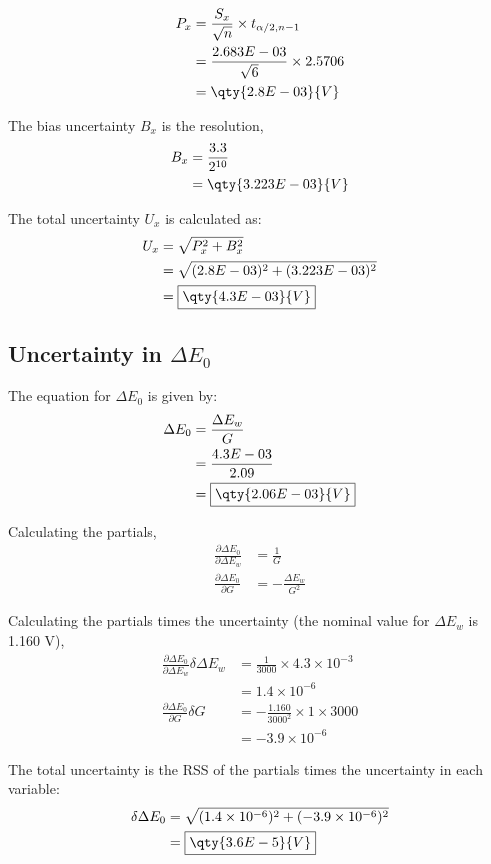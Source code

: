 \begin{align*}
    P_x &= \frac{S_x}{\sqrt{n}} \times t_{\alpha/2, n-1} \\
    &= \frac{2.683E-03}{\sqrt{6}} \times 2.5706 \\
    &= \qty{2.8E-03}{V}
\end{align*}

The bias uncertainty $B_x$ is the resolution, 
\begin{align*}
    B_x &= \frac{3.3}{2^{10}} \\
    &= \qty{3.223E-03}{V}
\end{align*}

The total uncertainty $U_x$ is calculated as:
\begin{align*}
    U_x &= \sqrt{P_x^2 + B_x^2} \\
    &= \sqrt{(2.8E-03)^2 + (3.223E-03)^2} \\
    &= \boxed{\qty{4.3E-03}{V}}
\end{align*}

\subsection{Uncertainty in $\Delta E_0$}
The equation for $\Delta E_0$ is given by:
\begin{align*}
    \Delta E_0 &= \frac{\Delta E_w}{G} \\
    &= \frac{4.3E-03}{2.09} \\
    &= \boxed{\qty{2.06E-03}{V}}
\end{align*}

Calculating the partials,
\begin{align*}
    \frac{\partial \Delta E_0}{\partial \Delta E_w} &= \frac{1}{G} \\
    \frac{\partial \Delta E_0}{\partial G} &= -\frac{\Delta E_w}{G^2}
\end{align*}

Calculating the partials times the uncertainty (the nominal value for $\Delta E_w$ is 1.160 V),
\begin{align*}
    \frac{\partial \Delta E_0}{\partial \Delta E_w} \delta \Delta E_w &=  \frac{1}{3000} \times 4.3 \times 10^{-3} \\
    & = 1.4\times 10^{-6} \\
    \frac{\partial \Delta E_0}{\partial G} \delta G &=  -\frac{1.160}{3000^2} \times 1 \times 3000 \\
    & = -3.9\times 10^{-6}
\end{align*}

The total uncertainty is the RSS of the partials times the uncertainty in each variable:
\begin{align*}
    \delta \Delta E_0 &= \sqrt{(1.4\times 10^{-6})^2 + (-3.9\times 10^{-6})^2} \\
    &= \boxed{\qty{3.6E-5}{V}}
\end{align*}